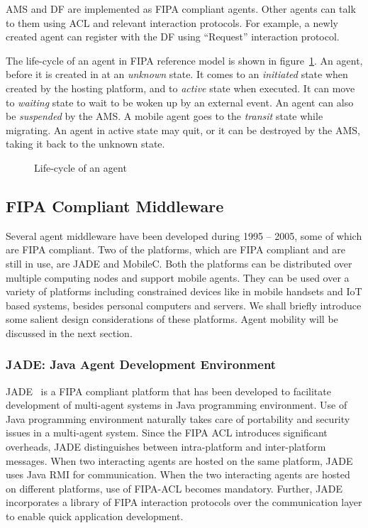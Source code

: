 \noindent
AMS and DF are implemented as FIPA compliant agents. Other agents can talk to them using ACL and relevant interaction protocols. 
For example, a newly created agent can register with the DF using ``Request'' interaction protocol. 

The life-cycle of an agent in FIPA reference model is shown in figure~\ref{fig:agents:life}. An agent, before it is created
in at an {\em unknown} state. It comes to an {\em initiated} state when created by the hosting platform, and to {\em active}
state when executed. It can move to {\em waiting} state to wait to be woken up by an external event. An agent can also be {\em suspended}
by the AMS. A mobile agent goes to the {\em transit} state while migrating. An agent in active state may quit, or it can be destroyed
by the AMS, taking it back to the unknown state.

\begin{figure}[!htbp]
	\centering
	\caption{Life-cycle of an agent}
	\label{fig:agents:life}
\end{figure}

\subsection{FIPA Compliant Middleware}

Several agent middleware have been developed during 1995  -- 2005, some of which are FIPA compliant. Two of the platforms,
which are FIPA compliant and are still in use, are JADE and MobileC. Both the platforms can be distributed over multiple 
computing nodes and support mobile agents. They can be used over a variety of platforms including constrained devices like
in mobile handsets and IoT based systems, besides personal computers and servers. We shall briefly introduce some salient 
design considerations of these platforms. Agent mobility will be discussed in the next section.

\subsubsection*{JADE: Java Agent Development Environment}

 
JADE~\citep{Bellifemine:2005} is a FIPA compliant platform that has been developed to facilitate development of multi-agent
systems in Java programming environment. Use of Java programming environment naturally takes care of portability and security
issues in a multi-agent system. Since the FIPA ACL introduces significant overheads, JADE distinguishes between 
intra-platform and inter-platform messages. When two interacting agents are hosted on the same platform, JADE uses Java 
RMI for communication. When the two interacting agents are hosted on different platforms, use of FIPA-ACL becomes mandatory. 
Further, JADE incorporates a library of FIPA interaction protocols over the communication layer to enable quick application
development. 

